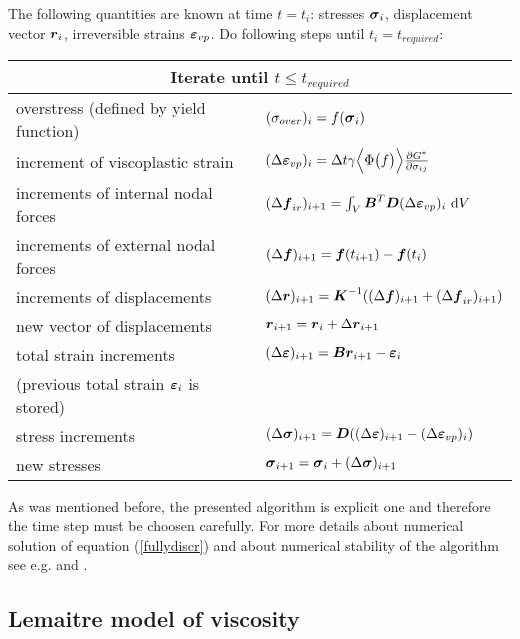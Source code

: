 The following quantities are known at time $t=t_i$: stresses $\mbox{\boldmath$\sigma$}_i$, displacement
vector $\mbox{\boldmath$r$}_i$, irreversible strains $\mbox{\boldmath$\varepsilon$}_{vp}$. Do following steps until $t_i=t_{required}$:

\begin{center}
\begin{tabular}{|l|l|}
\hline
\multicolumn{2}{|c|}{Iterate until $t \leq t_{required}$}
\\ \hline
overstress (defined by yield function) &
$(\sigma_{over})_i = f(\mbox{\boldmath$\sigma$}_i)$
\\[3mm]
increment of viscoplastic strain &
$(\Delta \mbox{\boldmath$\varepsilon$}_{vp})_i = \Delta t \gamma\Bigl\langle\Phi\bigl(f\bigl)\Bigr\rangle\frac{\partial G^*}{\partial\sigma_{ij}}$
\\[3mm]
increments of internal nodal forces &
$(\Delta \mbox{\boldmath$f$}_{ir})_{i+1} = \int_{V} \mbox{\boldmath$B$}^T \mbox{\boldmath$D$} (\Delta \mbox{\boldmath$\varepsilon$}_{vp})_i\ {\rm d}V$
\\[3mm]
increments of external nodal forces &
$(\Delta \mbox{\boldmath$f$})_{i+1} = \mbox{\boldmath$f$}(t_{i+1})-\mbox{\boldmath$f$}(t_i)$
\\[3mm]
increments of displacements &
$(\Delta \mbox{\boldmath$r$})_{i+1} = \mbox{\boldmath$K$}^{-1} ((\Delta \mbox{\boldmath$f$})_{i+1} + (\Delta \mbox{\boldmath$f$}_{ir})_{i+1})$
\\[3mm]
new vector of displacements &
$\mbox{\boldmath$r$}_{i+1} = \mbox{\boldmath$r$}_{i} + \Delta \mbox{\boldmath$r$}_{i+1}$
\\[3mm]
total strain increments &
$(\Delta \mbox{\boldmath$\varepsilon$})_{i+1}=\mbox{\boldmath$B$}\mbox{\boldmath$r$}_{i+1}-\mbox{\boldmath$\varepsilon$}_{i}$
\\[1mm]
(previous total strain $\mbox{\boldmath$\varepsilon$}_{i}$ is stored) &
\\[3mm]
stress increments &
$(\Delta \mbox{\boldmath$\sigma$})_{i+1}=\mbox{\boldmath$D$} ((\Delta \mbox{\boldmath$\varepsilon$})_{i+1} - (\Delta \mbox{\boldmath$\varepsilon$}_{vp})_i)$
\\[3mm]
new stresses &
$\mbox{\boldmath$\sigma$}_{i+1} = \mbox{\boldmath$\sigma$}_{i}+(\Delta \mbox{\boldmath$\sigma$})_{i+1}$
\\ \hline
\end{tabular}
\end{center}

As was mentioned before, the presented algorithm is explicit one and therefore the time step
must be choosen carefully.
For more details about numerical solution of equation (\ref{fullydiscr}) and about numerical stability
of the algorithm see e.g. \cite{Plesek} and \cite{Cormeau}.

\subsection{Lemaitre model of viscosity}
\label{sectlemaitremodel}


